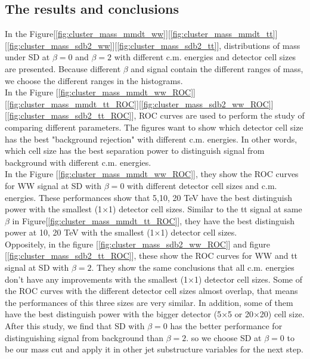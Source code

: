 \subsection{The results and conclusions}
In the Figure[\ref{fig:cluster_mass_mmdt_ww}][\ref{fig:cluster_mass_mmdt_tt}][\ref{fig:cluster_mass_sdb2_ww}][\ref{fig:cluster_mass_sdb2_tt}], distributions of mass under SD at  $\beta=0$ and $\beta=2$ with different c.m. energies and detector cell sizes are presented. Because different $\beta$ and signal contain the different ranges of mass, we choose the different ranges in the histograms.\\

In the Figure [\ref{fig:cluster_mass_mmdt_ww_ROC}][\ref{fig:cluster_mass_mmdt_tt_ROC}][\ref{fig:cluster_mass_sdb2_ww_ROC}][\ref{fig:cluster_mass_sdb2_tt_ROC}], ROC curves are used to perform the study of comparing different parameters. The figures want to show which detector cell size has the best "background rejection" with different c.m. energies. In other words, which cell size has the best separation power to distinguish signal from background with different c.m. energies.\\

In the Figure [\ref{fig:cluster_mass_mmdt_ww_ROC}], they show the ROC curves for WW signal at SD with $\beta=0$  with different detector cell sizes and c.m. energies. These performances show that 5,10, 20 TeV have the best distinguish power with the smallest (1$\times$1) detector cell sizes. Similar to the tt signal at same $\beta$ in Figure[\ref{fig:cluster_mass_mmdt_tt_ROC}], they have the best distinguish power at 10, 20 TeV with the smallest (1$\times$1) detector cell sizes.\\

Oppositely, in the figure [\ref{fig:cluster_mass_sdb2_ww_ROC}] and figure [\ref{fig:cluster_mass_sdb2_tt_ROC}], these show the ROC curves for WW and tt signal at SD with $\beta=2$. They show the same conclusions that all c.m. energies don't have any improvements with the smallest (1$\times$1) detector cell sizes. Some of the ROC curves with the different detector cell sizes almost overlap, that means the performances of this three sizes are very similar. In addition, some of them have the best distinguish power with the bigger detector (5$\times$5 or 20$\times$20) cell size. \\

After this study, we find that SD with $\beta=0$ has the better performance for distinguishing signal from background than $\beta=2$. so we choose SD at $\beta=0$ to be our mass cut and apply it in other jet substructure variables for the next step.\\
 
